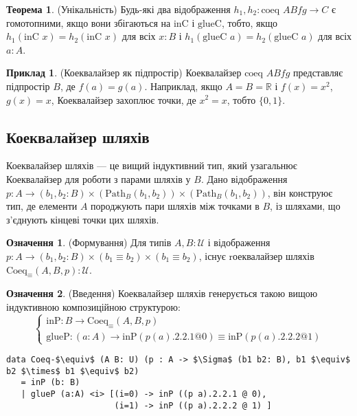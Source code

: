 \documentclass{article}
\theoremstyle{definition}
\newtheorem{theorem}{Теорема}
\newtheorem{definition}{Означення}
\newtheorem{example}{Приклад}
\begin{document}
\begin{theorem} (Унікальність)
Будь-які два відображення \( h_1, h_2 : \text{coeq } A B f g \to C \) є гомотопними,
якщо вони збігаються на \( \text{inC} \) і \( \text{glueC} \), тобто,
якщо \( h_1(\text{inC } x) = h_2(\text{inC } x) \) для
всіх \( x : B \) і \( h_1(\text{glueC } a) = h_2(\text{glueC } a) \) для всіх \( a : A \).
\end{theorem}

\begin{example} (Коеквалайзер як підпростір)
Коеквалайзер \( \text{coeq } A B f g \) представляє підпростір
\( B \), де \( f(a) = g(a) \). Наприклад, якщо \( A = B = \mathbb{R} \)
і \( f(x) = x^2 \), \( g(x) = x \), Коеквалайзер захоплює точки,
де \( x^2 = x \), тобто \( \{0, 1\} \).
\end{example}

\subsection{Коеквалайзер шляхів}
Коеквалайзер шляхів — це вищий індуктивний тип, який узагальнює
Коеквалайзер для роботи з парами шляхів у \( B \). Дано
відображення \( p : A \to (b_1, b_2 : B) \times (\text{Path}_B (b_1, b_2)) \times (\text{Path}_B (b_1, b_2)) \),
він конструює тип, де елементи \( A \) породжують пари
шляхів між точками в \( B \), із шляхами, що з’єднують
кінцеві точки цих шляхів.

\begin{definition} (Формування)
Для типів \( A, B : \mathcal{U} \) і відображення \( p : A \to (b_1, b_2 : B) \times (b_1 \equiv b_2) \times (b_1 \equiv b_2) \),
існує rоеквалайзер шляхів \( \text{Coeq}_\equiv(A,B,p) : \mathcal{U} \).
\end{definition}

\begin{definition} (Введення)
Коеквалайзер шляхів генерується такою вищою індуктивною композиційною структурою:
\[
\begin{cases}
\text{inP} : B \to \text{Coeq}_\equiv(A,B,p) \\
\text{glueP} : (a : A) \to \text{inP}(p(a).2.2.1 @ 0) \equiv \text{inP}(p(a).2.2.2 @ 1)
\end{cases}
\]
\begin{lstlisting}[mathescape=true]
data Coeq-$\equiv$ (A B: U) (p : A -> $\Sigma$ (b1 b2: B), b1 $\equiv$ b2 $\times$ b1 $\equiv$ b2)
   = inP (b: B)
   | glueP (a:A) <i> [(i=0) -> inP ((p a).2.2.1 @ 0),
                      (i=1) -> inP ((p a).2.2.2 @ 1) ]
\end{lstlisting}
\end{definition}
\end{document}
